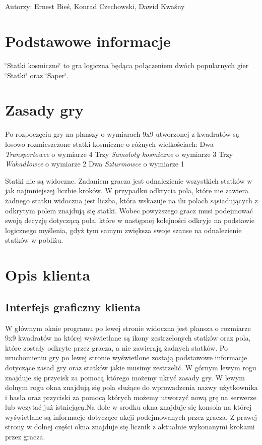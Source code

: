 \subsection*{}

Autorzy\+: Ernest Bieś, Konrad Czechowski, Dawid Kwaśny





\section*{Podstawowe informacje }

\char`\"{}\+Statki kosmiczne\char`\"{} to gra logiczna będąca połączeniem dwóch popularnych gier \char`\"{}\+Statki\char`\"{} oraz \char`\"{}\+Saper\char`\"{}.

\section*{Zasady gry }

Po rozpoczęciu gry na planszy o wymiarach 9x9 utworzonej z kwadratów są losowo rozmieszczone statki kosmiczne o różnych wielkościach\+: Dwa {\itshape Transportowce} o wymiarze 4 Trzy {\itshape Samoloty kosmiczne} o wymiarze 3 Trzy {\itshape Wahadłowce} o wymiarze 2 Dwa {\itshape Szturmowce} o wymiarze 1

Statki nie są widoczne. Zadaniem gracza jest odnalezienie wszystkich statków w jak najmniejszej liczbie kroków. W przypadku odkrycia pola, które nie zawiera żadnego statku widoczna jest liczba, która wskazuje na ilu polach sąsiadujących z odkrytym polem znajdują się statki. Wobec powyższego gracz musi podejmować swoją decyzję dotyczącą pola, które w następnej kolejności odkryje na podstawie logicznego myślenia, gdyż tym samym zwiększa swoje szanse na odnalezienie statków w pobliżu.

\section*{Opis klienta }

\subsection*{Interfejs graficzny klienta }



W głównym oknie programu po lewej stronie widoczna jest plansza o rozmiarze 9x9 kwadratów na której wyświetlane są ikony zestrzelonych statków oraz pola, które zostały odkryte przez gracza, a nie zawierają żadnych statków. Po uruchomieniu gry po lewej stronie wyświetlone zostają podstawowe informacje dotyczące zasad gry oraz statków jakie musimy zestrzelić. W górnym lewym rogu znajduje się przycisk za pomocą którego możemy ukryć zasady gry. W lewym dolnym rogu okna znajdują się pola służące do wprowadzenia nazwy użytkownika i hasła oraz przyciski za pomocą których możemy utworzyć nową grę na serwerze lub wczytać już istniejącą.\+Na dole w srodku okna znajduje się konsola na której wyświetlane są informacje dotyczące akcji podejmowanych przez gracza. Z prawej strony w dolnej części okna znajduje się licznik z aktualnie wykonanymi krokami przez gracza.




